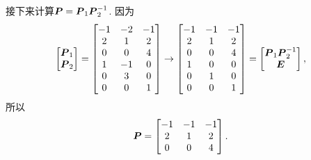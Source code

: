 \begin{example}
\begin{solution}
接下来计算\(\boldsymbol{P} = \boldsymbol{P}_1 \boldsymbol{P}_2^{-1}\).
因为\begin{equation*}
	\begin{bmatrix}
		\boldsymbol{P}_1 \\
		\boldsymbol{P}_2
	\end{bmatrix}
	= \begin{bmatrix}
		-1 & -2 & -1 \\
		2 & 1 & 2 \\
		0 & 0 & 4 \\
		1 & -1 & 0 \\
		0 & 3 & 0 \\
		0 & 0 & 1
	\end{bmatrix}
	\to \begin{bmatrix}
		-1 & -1 & -1 \\
		2 & 1 & 2 \\
		0 & 0 & 4 \\
		1 & 0 & 0 \\
		0 & 1 & 0 \\
		0 & 0 & 1
	\end{bmatrix}
	= \begin{bmatrix}
		\boldsymbol{P}_1 \boldsymbol{P}_2^{-1} \\
		\boldsymbol{E}
	\end{bmatrix},
\end{equation*}
所以\begin{equation*}
	\boldsymbol{P} = \begin{bmatrix}
		-1 & -1 & -1 \\
		2 & 1 & 2 \\
		0 & 0 & 4
	\end{bmatrix}.
\end{equation*}
\end{solution}
\end{example}

